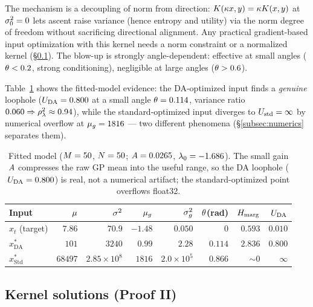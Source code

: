 \begin{remark}
The mechanism is a decoupling of norm from direction: $K(\kappa x,y)=\kappa K(x,y)$
at $\sigma_{0}^2=0$ lets ascent raise variance (hence entropy and utility) via the norm
degree of freedom without sacrificing directional alignment. Any practical
gradient-based input optimization with this kernel needs a norm constraint or a
normalized kernel (\S\ref{subsec:kernelfixes}). The blow-up is strongly
angle-dependent: effective at small angles ($\theta<0.2$, strong
conditioning), negligible at large angles ($\theta>0.6$).
\end{remark}

Table~\ref{tab:divevidence} shows the fitted-model evidence: the DA-optimized
input finds a \emph{genuine} loophole ($U_{\mathrm{DA}}=0.800$ at a small angle
$\theta=0.114$, variance ratio $0.060\Rightarrow\rho_{\lambda}^2\approx0.94$), while the
standard-optimized input diverges to $U_{\mathrm{std}}=\infty$ by numerical
overflow at $\mu_{g}=1816$ --- two different phenomena
(\S\ref{subsec:numerics} separates them).

\begin{table}[t]\centering\small
\caption{Fitted model ($M=50$, $N=50$; $A=0.0265$,
$\lambda_{0}=-1.686$). The small gain $A$ compresses the raw GP mean into the useful
range, so the DA loophole ($U_{\mathrm{DA}}=0.800$) is real, not a numerical artifact; the
standard-optimized point overflows float32.}
\label{tab:divevidence}
\begin{tabular}{lrrrrrrr}
\toprule
Input & $\mu$ & $\sigma^{2}$ & $\mu_{g}$ & $\sigma_{g}^{2}$ & $\theta$(rad) & $H_{\mathrm{marg}}$ & $U_{\mathrm{DA}}$\\
\midrule
$x_t$ (target) & $7.86$ & $70.9$ & $-1.48$ & $0.050$ & $0$ & $0.593$ & $0.010$\\
$x^*_{\mathrm{DA}}$ & $101$ & $3240$ & $0.99$ & $2.28$ & $0.114$ & $2.836$ & $0.800$\\
$x^*_{\mathrm{Std}}$ & $68497$ & $2.85\!\times\!10^{8}$ & $1816$ & $2.0\!\times\!10^{5}$ & $0.866$ & $\sim0$ & $\infty$\\
\bottomrule
\end{tabular}
\end{table}

\subsection{Kernel solutions (Proof II)}
\label{subsec:kernelfixes}

